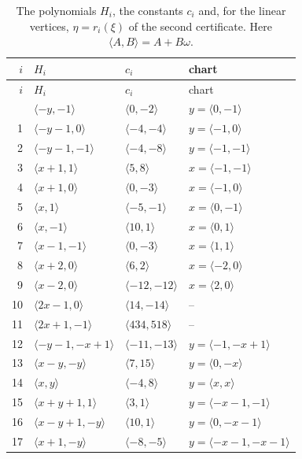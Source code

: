 \documentclass[11pt]{article}
\begin{document}
\begingroup\small
\setlength{\LTcapwidth}{\textwidth}
\begin{longtable}{@{}rlll@{}}
\caption{The polynomials $H_i$, the constants $c_i$ and, for the linear vertices, $\eta=r_i(\xi)$ of the second certificate. Here $\langle A,B\rangle=A+B\omega$.}\label{tab:vert2}\\
\hline $i$ & $H_i$ & $c_i$ & chart\\\hline\endfirsthead\hline $i$ & $H_i$ & $c_i$ & chart\\\hline\endhead\hline\endfoot
0 & $\langle -y,-1\rangle$ & $\langle 0,-2\rangle$ & $y=\langle 0,-1\rangle$\\
1 & $\langle -y-1,0\rangle$ & $\langle -4,-4\rangle$ & $y=\langle -1,0\rangle$\\
2 & $\langle -y-1,-1\rangle$ & $\langle -4,-8\rangle$ & $y=\langle -1,-1\rangle$\\
3 & $\langle x+1,1\rangle$ & $\langle 5,8\rangle$ & $x=\langle -1,-1\rangle$\\
4 & $\langle x+1,0\rangle$ & $\langle 0,-3\rangle$ & $x=\langle -1,0\rangle$\\
5 & $\langle x,1\rangle$ & $\langle -5,-1\rangle$ & $x=\langle 0,-1\rangle$\\
6 & $\langle x,-1\rangle$ & $\langle 10,1\rangle$ & $x=\langle 0,1\rangle$\\
7 & $\langle x-1,-1\rangle$ & $\langle 0,-3\rangle$ & $x=\langle 1,1\rangle$\\
8 & $\langle x+2,0\rangle$ & $\langle 6,2\rangle$ & $x=\langle -2,0\rangle$\\
9 & $\langle x-2,0\rangle$ & $\langle -12,-12\rangle$ & $x=\langle 2,0\rangle$\\
10 & $\langle 2x-1,0\rangle$ & $\langle 14,-14\rangle$ & --\\
11 & $\langle 2x+1,-1\rangle$ & $\langle 434,518\rangle$ & --\\
12 & $\langle -y-1,-x+1\rangle$ & $\langle -11,-13\rangle$ & $y=\langle -1,-x+1\rangle$\\
13 & $\langle x-y,-y\rangle$ & $\langle 7,15\rangle$ & $y=\langle 0,-x\rangle$\\
14 & $\langle x,y\rangle$ & $\langle -4,8\rangle$ & $y=\langle x,x\rangle$\\
15 & $\langle x+y+1,1\rangle$ & $\langle 3,1\rangle$ & $y=\langle -x-1,-1\rangle$\\
16 & $\langle x-y+1,-y\rangle$ & $\langle 10,1\rangle$ & $y=\langle 0,-x-1\rangle$\\
17 & $\langle x+1,-y\rangle$ & $\langle -8,-5\rangle$ & $y=\langle -x-1,-x-1\rangle$\\

\end{longtable}
\end{document}
